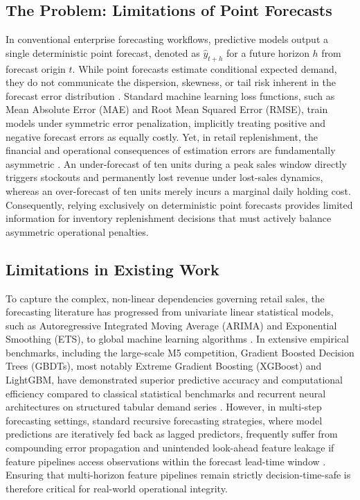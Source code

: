 \documentclass[11pt,a4paper]{article}
\begin{document}
\subsection{The Problem: Limitations of Point Forecasts}
\label{sec:intro_problem}
In conventional enterprise forecasting workflows, predictive models output a single deterministic point forecast, denoted as $\hat{y}_{t+h}$ for a future horizon $h$ from forecast origin $t$. While point forecasts estimate conditional expected demand, they do not communicate the dispersion, skewness, or tail risk inherent in the forecast error distribution \cite{gneiting2007strictly}. Standard machine learning loss functions, such as Mean Absolute Error (MAE) and Root Mean Squared Error (RMSE), train models under symmetric error penalization, implicitly treating positive and negative forecast errors as equally costly. Yet, in retail replenishment, the financial and operational consequences of estimation errors are fundamentally asymmetric \cite{ban2019big, bertsimas2020predictive}. An under-forecast of ten units during a peak sales window directly triggers stockouts and permanently lost revenue under lost-sales dynamics, whereas an over-forecast of ten units merely incurs a marginal daily holding cost. Consequently, relying exclusively on deterministic point forecasts provides limited information for inventory replenishment decisions that must actively balance asymmetric operational penalties.

\subsection{Limitations in Existing Work}
\label{sec:intro_limitations}
To capture the complex, non-linear dependencies governing retail sales, the forecasting literature has progressed from univariate linear statistical models, such as Autoregressive Integrated Moving Average (ARIMA) and Exponential Smoothing (ETS), to global machine learning algorithms \cite{mustapha2025forecasting, yeesin2024application}. In extensive empirical benchmarks, including the large-scale M5 competition, Gradient Boosted Decision Trees (GBDTs), most notably Extreme Gradient Boosting (XGBoost) and LightGBM, have demonstrated superior predictive accuracy and computational efficiency compared to classical statistical benchmarks and recurrent neural architectures on structured tabular demand series \cite{makridakis2022m5, chen2016xgboost, hobor2026comparative, alghurabli2025ai}. However, in multi-step forecasting settings, standard recursive forecasting strategies, where model predictions are iteratively fed back as lagged predictors, frequently suffer from compounding error propagation and unintended look-ahead feature leakage if feature pipelines access observations within the forecast lead-time window \cite{tiwari2026explainable}. Ensuring that multi-horizon feature pipelines remain strictly decision-time-safe is therefore critical for real-world operational integrity.
\end{document}
